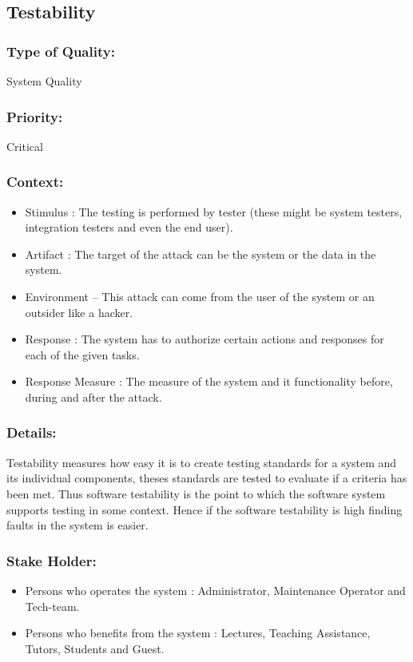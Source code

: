 \documentclass[11pt]{article}
\begin{document}
	\subsection{Testability}
	
		\subsubsection{Type of Quality:}
			\textbf{} System Quality
		
		\subsubsection{Priority:}
			\textbf{} Critical

		\subsubsection{Context:}
		\begin{itemize}
			\item Stimulus : The testing is performed by tester (these might be system testers, integration testers and even the end user).
			\item Artifact : The target of the attack can be the system or the data in the system.
			\item Environment – This attack can come from the user of the system or an outsider like a hacker. 
			\item Response : The system has to authorize certain actions and responses for each of the given tasks.
			\item Response Measure : The measure of the system and it functionality before, during and after the attack.
		\end{itemize}
		
		\subsubsection{Details:}
			\textbf{}Testability measures how easy it is to create testing standards for a system and its individual components, theses standards are tested to evaluate if a criteria has been met. Thus software testability is the point to which the software system supports testing in some context. Hence if the software testability is high finding faults in the system is easier.
		
		\subsubsection{Stake Holder:}
		\begin{itemize}
			\item Persons who operates the system : Administrator, Maintenance Operator and Tech-team.
			\item Persons who benefits from the system : Lectures, Teaching Assistance, Tutors, Students and Guest.
			\end{itemize}		
		
\end{document}
